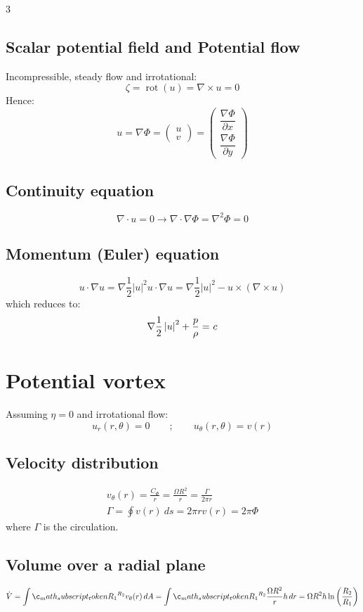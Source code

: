 \documentclass[9pt, landscape, a4paper]{article}
\newcommand{\const}{%
  \ \mathrel{\ooalign{%
    \hfil$c$\hfil\cr
    \hfil\kern0.10em\raisebox{-0.4ex}{\rule{0.08pt}{1.7ex}}\hfil\cr
  }}%
}
\newcommand{\dm}{\displaystyle}
\DeclareMathOperator{\rot}{rot}
\begin{document}
\begin{multicols*}{3}
\subsection{Scalar potential field and Potential flow}
Incompressible, steady flow and irrotational:
\[\zeta = \rot(u) = \nabla \times u = 0\]
Hence:
\[u = \nabla\Phi = \begin{pmatrix}
  u\\v
\end{pmatrix} =
\begin{pmatrix}
  \dfrac{\nabla \Phi}{\partial x}\\[1.5ex]
  \dfrac{\nabla \Phi}{\partial y}
\end{pmatrix}\]

\subsection{Continuity equation}
\[\nabla \cdot u = 0 \to \nabla\cdot\nabla\Phi = \nabla^2\Phi = 0\]

\subsection{Momentum (Euler) equation}
\[u\cdot\nabla u = \nabla\frac{1}{2}\left|u\right|^2u \cdot \nabla u = \nabla\frac{1}{2}\left|u\right|^2-u\times(\nabla\times u)\]
which reduces to:
\[\nabla\frac{1}{2}\left|u\right|^2+\frac{p}{\rho}=\const\]

\section{Potential vortex}
Assuming $\eta = 0$ and irrotational flow:
\[u_r (r,\theta) = 0 \qquad ; \qquad u_\theta (r,\theta) = v(r)\]

\subsection{Velocity distribution}
\begin{gather*}
  \dm v_\theta(r) = \frac{C_\Phi}{r} = \frac{\Omega R^2}{r} = \frac{\Gamma}{2\pi r}\\
  \dm \Gamma = \oint v(r)\ ds = 2\pi r v(r) = 2\pi\Phi
\end{gather*}
where $\Gamma$ is the circulation.

\newcolumn
\subsection{Volume over a radial plane}
\[\dot{V} = \integral[R_1][R_2][v_\theta(r)][A] = \integral[R_1][R_2][\frac{\Omega R^2}{r} h][r] = \Omega R^2 h \ln\left(\frac{R_2}{R_1}\right)\]


\end{multicols*}
\end{document}
